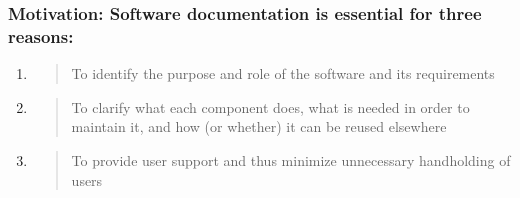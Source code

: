 \documentclass[]{article}
\date{}
\begin{document}
\pagestyle{fancy}
\renewcommand{\headrulewidth}{0pt}
  
\thispagestyle{empty}
\textbf{\newline}


\subsubsection{\texorpdfstring{\textbf{Motivation}: Software
documentation is essential for three
reasons:}{Motivation: Software documentation is essential for three reasons:}}\label{motivation-software-documentation-is-essential-for-three-reasons}

\begin{enumerate}
\def\labelenumi{(\arabic{enumi})}
\item
  \begin{quote}
  To identify the purpose and role of the software and its requirements
  \end{quote}
\item
  \begin{quote}
  To clarify what each component does, what is needed in order to
  maintain it, and how (or whether) it can be reused elsewhere
  \end{quote}
\item
  \begin{quote}
  To provide user support and thus minimize unnecessary handholding of
  users
  \end{quote}
\end{enumerate}
\end{document}
